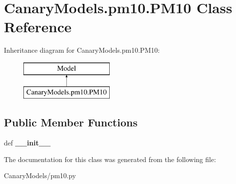\hypertarget{class_canary_models_1_1pm10_1_1_p_m10}{\section{Canary\-Models.\-pm10.\-P\-M10 Class Reference}
\label{class_canary_models_1_1pm10_1_1_p_m10}
}
Inheritance diagram for Canary\-Models.\-pm10.\-P\-M10\-:\begin{figure}[H]
\begin{center}
\leavevmode
\includegraphics[height=2.000000cm]{class_canary_models_1_1pm10_1_1_p_m10}
\end{center}
\end{figure}
\subsection*{Public Member Functions}
\begin{DoxyCompactItemize}
\item 
\hypertarget{class_canary_models_1_1pm10_1_1_p_m10_a7948b1ef67592bf421860a7cc431dccc}{def {\bfseries \-\_\-\-\_\-init\-\_\-\-\_\-}}\label{class_canary_models_1_1pm10_1_1_p_m10_a7948b1ef67592bf421860a7cc431dccc}

\end{DoxyCompactItemize}


The documentation for this class was generated from the following file\-:\begin{DoxyCompactItemize}
\item 
Canary\-Models/pm10.\-py\end{DoxyCompactItemize}
